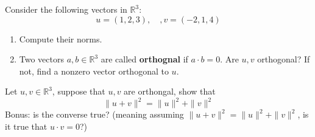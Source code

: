 \documentclass[openany]{book}
\newcommand{\R}{\mathbb{R}}
\begin{document}
\begin{prob}
    Consider the following vectors in $\R^3$:
    \begin{equation*}
        u=(1,2,3), \quad, v=(-2, 1, 4)
    \end{equation*}
    \begin{enumerate}
        \item Compute their norms.
        \item  Two vectors $a,b\in\R^3$ are called \textbf{orthognal} if $a\cdot b=0$. Are $u,v$ orthogonal? If not, find a nonzero vector orthogonal to $u$.
    \end{enumerate}
\end{prob}





\begin{prob}
    Let $u,v\in\R^3$, suppose that $u,v$ are orthongal, show that 
    \begin{equation*}
        \|u+v\|^2=\|u\|^2+\|v\|^2
    \end{equation*}
    Bonus: is the converse true? (meaning assuming $ \|u+v\|^2=\|u\|^2+\|v\|^2$, is it true that $u\cdot v=0$?)
\end{prob}
\end{document}

